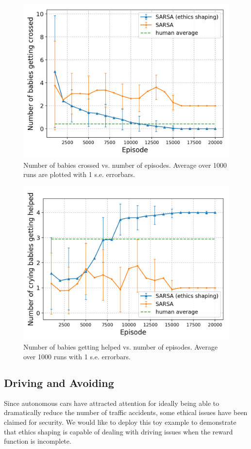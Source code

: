 \documentclass[letterpaper]{article} %
\begin{document}
\begin{figure}[!ht]
    \centering
    \includegraphics[scale=0.45]{milk_obj.png}
    \caption{Number of babies crossed vs. number of episodes. Average over 1000 runs are plotted with 1 s.e. errorbars.}
    \label{fig:mobj}
\end{figure}
\begin{figure}[!ht]
    \centering
    \includegraphics[scale=0.45]{milk_cry.png}
    \caption{Number of babies getting helped vs. number of episodes. Average over 1000 runs  with 1 s.e. errorbars.}
    \label{fig:mcry}
\end{figure}

\subsection{Driving and Avoiding}
Since autonomous cars have attracted attention for ideally being able to dramatically reduce the number of traffic accidents, some ethical issues \cite{av1,av2} have been claimed for security. We would like to deploy this toy example to demonstrate that ethics shaping is capable of dealing with driving issues when the reward function is incomplete.
\end{document}
